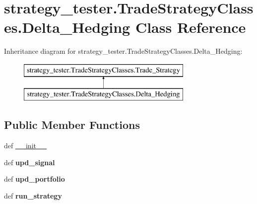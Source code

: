 \hypertarget{classstrategy__tester_1_1TradeStrategyClasses_1_1Delta__Hedging}{\section{strategy\-\_\-tester.\-Trade\-Strategy\-Classes.\-Delta\-\_\-\-Hedging \-Class \-Reference}
\label{classstrategy__tester_1_1TradeStrategyClasses_1_1Delta__Hedging}
}
\-Inheritance diagram for strategy\-\_\-tester.\-Trade\-Strategy\-Classes.\-Delta\-\_\-\-Hedging\-:\begin{figure}[H]
\begin{center}
\leavevmode
\includegraphics[height=2.000000cm]{classstrategy__tester_1_1TradeStrategyClasses_1_1Delta__Hedging}
\end{center}
\end{figure}
\subsection*{\-Public \-Member \-Functions}
\begin{DoxyCompactItemize}
\item 
def \hyperlink{classstrategy__tester_1_1TradeStrategyClasses_1_1Delta__Hedging_af85b319fc96ea231fa35546590b546d6}{\-\_\-\-\_\-init\-\_\-\-\_\-}
\item 
\hypertarget{classstrategy__tester_1_1TradeStrategyClasses_1_1Delta__Hedging_aa649ba357f37549c291cc9840412306c}{def {\bfseries upd\-\_\-signal}}\label{classstrategy__tester_1_1TradeStrategyClasses_1_1Delta__Hedging_aa649ba357f37549c291cc9840412306c}

\item 
\hypertarget{classstrategy__tester_1_1TradeStrategyClasses_1_1Delta__Hedging_a2223f1b237cdfe2aa3a28c68b3aa35e9}{def {\bfseries upd\-\_\-portfolio}}\label{classstrategy__tester_1_1TradeStrategyClasses_1_1Delta__Hedging_a2223f1b237cdfe2aa3a28c68b3aa35e9}

\item 
\hypertarget{classstrategy__tester_1_1TradeStrategyClasses_1_1Delta__Hedging_add642f48c9bbf2636e3c3357fcde4b9f}{def {\bfseries run\-\_\-strategy}}\label{classstrategy__tester_1_1TradeStrategyClasses_1_1Delta__Hedging_add642f48c9bbf2636e3c3357fcde4b9f}

\end{DoxyCompactItemize}
